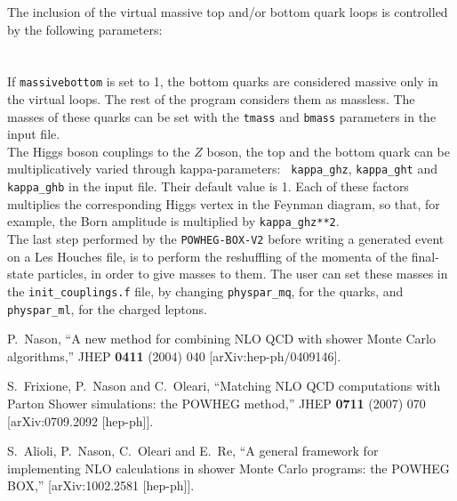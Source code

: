 \documentclass[paper]{JHEP3}
\newcommand\POWHEGBOXV{{\tt POWHEG-BOX-V2}}
\begin{document}
{\noindent The inclusion of the virtual massive top and/or bottom quark loops
is controlled by the following parameters:\\
\\
\\
%
If {\tt massivebottom} is set to 1, the bottom quarks are considered massive
only in the virtual loops. The rest of the program considers them as
massless. The masses of these quarks can be set with the {\tt tmass} and
{\tt bmass} parameters in the input file.\\


\noindent The Higgs boson couplings to the $Z$ boson, the top and the bottom
quark can be multiplicatively varied through kappa-parameters: {\tt
  kappa\_ghz}, {\tt kappa\_ght} and {\tt kappa\_ghb} in the input file. Their
default value is 1. Each of these factors multiplies the corresponding Higgs
vertex in the Feynman diagram, so that, for example, the Born amplitude is
multiplied by {\tt kappa\_ghz**2}. \\

\noindent The last step performed by the \POWHEGBOXV{} before writing a
generated event on a Les Houches file, is to perform the reshuffling of the
momenta of the final-state particles, in order to give masses to them. The
user can set these masses in the {\tt init\_couplings.f} file, by changing
{\tt physpar\_mq}, for the quarks, and {\tt physpar\_ml}, for the charged
leptons.


\begin{thebibliography}{10}

  P.~Nason,
  ``A new method for combining NLO QCD with shower Monte Carlo algorithms,''
  JHEP {\bf 0411} (2004) 040
  [arXiv:hep-ph/0409146].

  S.~Frixione, P.~Nason and C.~Oleari,
``Matching NLO QCD computations with Parton Shower simulations: the POWHEG
method,''
  JHEP {\bf 0711} (2007) 070
  [arXiv:0709.2092 [hep-ph]].

  S.~Alioli, P.~Nason, C.~Oleari and E.~Re,
``A general framework for implementing NLO calculations in shower Monte Carlo
  programs: the POWHEG BOX,''
  [arXiv:1002.2581 [hep-ph]].


\end{thebibliography}}
\end{document}

